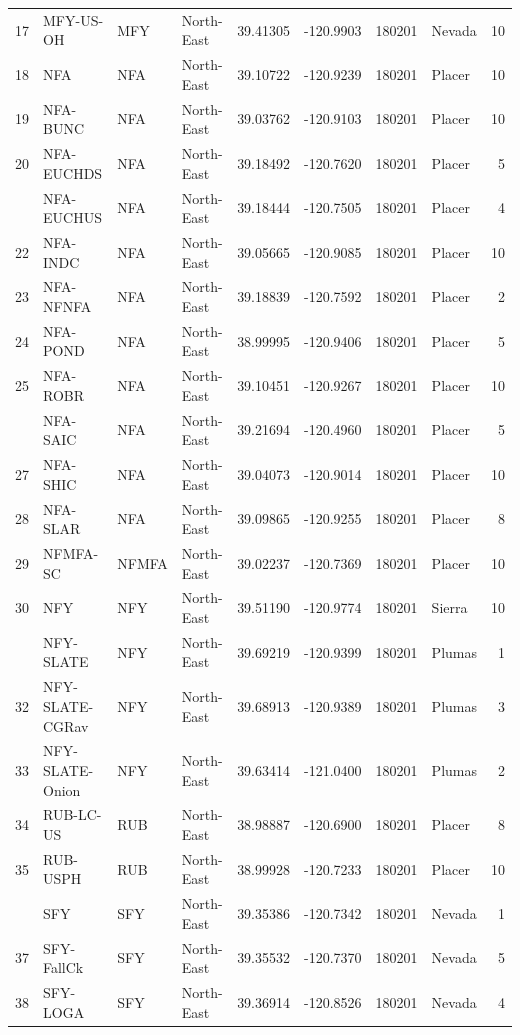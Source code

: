 \documentclass[proquest,12pt,final]{ucthesis-CA2012} %
\begin{document}
\begin{ucmainmatter}
\begin{longtable}[t]{rlllrrrlr}
17 & MFY-US-OH & MFY & North-East & 39.41305 & -120.9903 & 180201 & Nevada & 10\\
18 & NFA & NFA & North-East & 39.10722 & -120.9239 & 180201 & Placer & 10\\
19 & NFA-BUNC & NFA & North-East & 39.03762 & -120.9103 & 180201 & Placer & 10\\
20 & NFA-EUCHDS & NFA & North-East & 39.18492 & -120.7620 & 180201 & Placer & 5\\
\addlinespace
21 & NFA-EUCHUS & NFA & North-East & 39.18444 & -120.7505 & 180201 & Placer & 4\\
22 & NFA-INDC & NFA & North-East & 39.05665 & -120.9085 & 180201 & Placer & 10\\
23 & NFA-NFNFA & NFA & North-East & 39.18839 & -120.7592 & 180201 & Placer & 2\\
24 & NFA-POND & NFA & North-East & 38.99995 & -120.9406 & 180201 & Placer & 5\\
25 & NFA-ROBR & NFA & North-East & 39.10451 & -120.9267 & 180201 & Placer & 10\\
\addlinespace
26 & NFA-SAIC & NFA & North-East & 39.21694 & -120.4960 & 180201 & Placer & 5\\
27 & NFA-SHIC & NFA & North-East & 39.04073 & -120.9014 & 180201 & Placer & 10\\
28 & NFA-SLAR & NFA & North-East & 39.09865 & -120.9255 & 180201 & Placer & 8\\
29 & NFMFA-SC & NFMFA & North-East & 39.02237 & -120.7369 & 180201 & Placer & 10\\
30 & NFY & NFY & North-East & 39.51190 & -120.9774 & 180201 & Sierra & 10\\
\addlinespace
31 & NFY-SLATE & NFY & North-East & 39.69219 & -120.9399 & 180201 & Plumas & 1\\
32 & NFY-SLATE-CGRav & NFY & North-East & 39.68913 & -120.9389 & 180201 & Plumas & 3\\
33 & NFY-SLATE-Onion & NFY & North-East & 39.63414 & -121.0400 & 180201 & Plumas & 2\\
34 & RUB-LC-US & RUB & North-East & 38.98887 & -120.6900 & 180201 & Placer & 8\\
35 & RUB-USPH & RUB & North-East & 38.99928 & -120.7233 & 180201 & Placer & 10\\
\addlinespace
36 & SFY & SFY & North-East & 39.35386 & -120.7342 & 180201 & Nevada & 1\\
37 & SFY-FallCk & SFY & North-East & 39.35532 & -120.7370 & 180201 & Nevada & 5\\
38 & SFY-LOGA & SFY & North-East & 39.36914 & -120.8526 & 180201 & Nevada & 4\\

\end{longtable}
\end{ucmainmatter}
\end{document}
